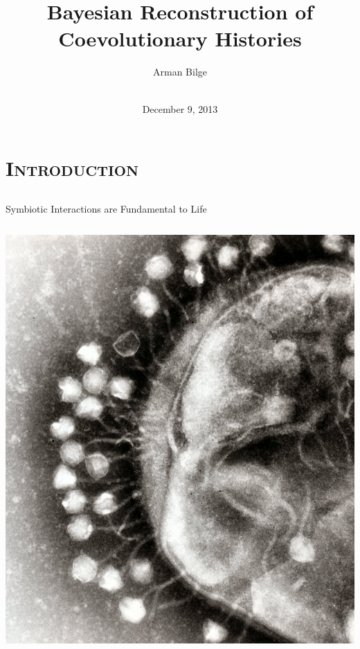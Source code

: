 \documentclass{beamer}
\title[Bayesian Reconstruction of Coevolutionary Histories]{Bayesian Reconstruction of \\ Coevolutionary Histories}
\author{Arman Bilge}
\institute[Arman Bilge]{\vspace{-0.25in}\\Faculty of Science\\The University of Auckland}
\date{\vspace{-0.25in}\\December 9, 2013}
\let\oldsection\section
\renewcommand{\section}[1]{\oldsection{\textsc{#1}}\subsection{}}
\begin{document}
\frame{\titlepage}

\section{Introduction}

\begin{frame}{Symbiotic Interactions are Fundamental to Life}

\begin{columns}

\begin{column}{0.556\textwidth}
\includegraphics[width=\textwidth]{figures/symbioses/Phage.jpg}
\end{column}


\end{columns}
\end{frame}
\end{document}
